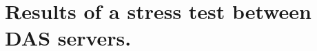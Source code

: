 \documentclass{harvard-thesis}
\begin{document}
\setcounter{tocdepth}{4}

\maketitle 			%
\copyrightpage
\abstractpage		%
\tableofcontents
\listoffigures
\dedicationpage	%
\acknowledgments 	%
\onehalfspacing










\singlespacing

\clearpage
{}


%

\appendix
\chapter{Results of a stress test between DAS servers.}
\label{ap:stress}
\end{document}
